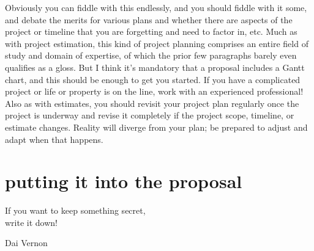 \documentclass[12pt,oneside]{book}
\begin{document}
Obviously you can fiddle with this endlessly, and you should fiddle with it some, and debate the merits for various plans and whether there are aspects of the project or timeline that you are forgetting and need to factor in, etc. Much as with project estimation, this kind of project planning comprises an entire field of study and domain of expertise, of which the prior few paragraphs barely even qualifies as a gloss. But I think it's mandatory that a proposal includes a Gantt chart, and this should be enough to get you started. If you have a complicated project or life or property is on the line, work with an experienced professional! Also as with estimates, you should revisit your project plan regularly once the project is underway and revise it completely if the project scope, timeline, or estimate changes. Reality will diverge from your plan; be prepared to adjust and adapt when that happens.

\newpage
{}
\chapter*{putting it into the proposal}
\label{scrivauto:49}

\label{scrivauto:50}

\epigraph{If you want to keep something secret, \\write it down!}{Dai Vernon}%

\label{scrivauto:51}
\end{document}
